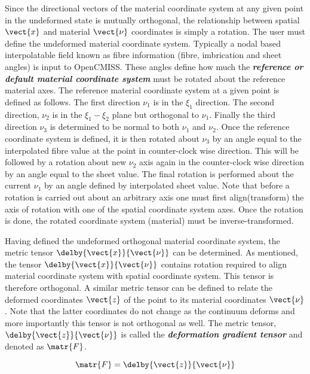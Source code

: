 Since the directional vectors of the material coordinate system at any given point in the undeformed state is mutually orthogonal, the 
relationship between spatial $\vect{x}$ and material $\vect{\nu}$ coordinates is simply a rotation. The user must define the undeformed 
material coordinate system. Typically a nodal based interpolatable field known as fibre information (fibre, imbrication and sheet angles) 
is input to OpenCMISS. These angles define how much the \textit{\textbf{reference or default material coordinate system}} must be rotated about 
the reference material axes. The reference material coordinate system at a given point is defined as follows. The first direction $\nu_{1}$ is 
in the $\xi_{1}$ direction. The second direction, $\nu_{2}$ is in the $\xi_{1}-\xi_{2}$ plane but orthogonal to $\nu_{1}$. Finally the third 
direction $\nu_{3}$ is determined to be normal to both $\nu_{1}$ and $\nu_{2}$. Once the reference coordinate system is defined, it is then rotated 
about $\nu_{3}$ by an angle equal to the interpolated fibre value at the point in counter-clock wise direction. This will be followed by a rotation 
about new $\nu_{2}$ axis again in the counter-clock wise direction by an angle equal to the sheet value. The final rotation is performed about the 
current $\nu_{1}$ by an angle defined by interpolated sheet value. Note that before a rotation is carried out about an arbitrary axis one must first 
align(transform) the axis of rotation with one of the spatial coordinate system axes. Once the rotation is done, the rotated coordinate 
system (material) must be inverse-transformed. 

Having defined the undeformed orthogonal material coordinate system, the metric tensor $\delby{\vect{x}}{\vect{\nu}}$ can be determined. As mentioned,
the tensor $\delby{\vect{x}}{\vect{\nu}}$ contains rotation required to align material coordinate system with spatial coordinate system. This tensor
is therefore orthogonal. A similar metric tensor can be defined to relate the deformed coordinates $\vect{z}$ of the point to its material
coordinates $\vect{\nu}$. Note that the latter coordinates do not change as the continuum deforms and more importantly this tensor is not 
orthogonal as well. The metric tensor, $\delby{\vect{z}}{\vect{\nu}}$ is called the \textit{\textbf{deformation gradient tensor}} and denoted 
as $\matr{F}$.

\begin{equation}
  \matr{F}=\delby{\vect{z}}{\vect{\nu}}
  \label{eqn:deformationgradienttensor}
\end{equation}
 
